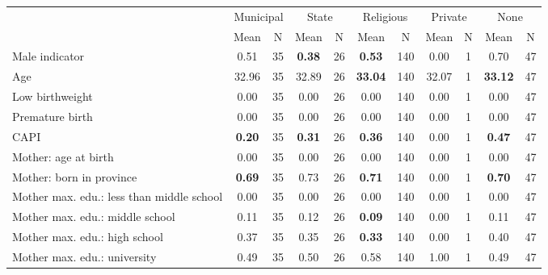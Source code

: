 \begin{tabular}{l c c c c c c c c c c}
\toprule
& \multicolumn{2}{c}{Municipal} & \multicolumn{2}{c}{State} & \multicolumn{2}{c}{Religious} & \multicolumn{2}{c}{Private} & \multicolumn{2}{c}{None} \\
& \scriptsize Mean & \scriptsize N & \scriptsize Mean & \scriptsize N & \scriptsize Mean & \scriptsize N & \scriptsize Mean & \scriptsize N & \scriptsize Mean & \scriptsize N \\
\midrule
Male indicator &      0.51 &        35 & \textbf{     0.38} &        26 & \textbf{     0.53} &       140 &      0.00 &         1 &      0.70 &        47 \\
Age &     32.96 &        35 &     32.89 &        26 & \textbf{    33.04} &       140 &     32.07 &         1 & \textbf{    33.12} &        47 \\
Low birthweight &      0.00 &        35 &      0.00 &        26 &      0.00 &       140 &      0.00 &         1 &      0.00 &        47 \\
Premature birth &      0.00 &        35 &      0.00 &        26 &      0.00 &       140 &      0.00 &         1 &      0.00 &        47 \\
CAPI & \textbf{     0.20} &        35 & \textbf{     0.31} &        26 & \textbf{     0.36} &       140 &      0.00 &         1 & \textbf{     0.47} &        47 \\
Mother: age at birth &      0.00 &        35 &      0.00 &        26 &      0.00 &       140 &      0.00 &         1 &      0.00 &        47 \\
Mother: born in province & \textbf{     0.69} &        35 &      0.73 &        26 & \textbf{     0.71} &       140 &      0.00 &         1 & \textbf{     0.70} &        47 \\
Mother max. edu.: less than middle school &      0.00 &        35 &      0.00 &        26 &      0.00 &       140 &      0.00 &         1 &      0.00 &        47 \\
Mother max. edu.: middle school &      0.11 &        35 &      0.12 &        26 & \textbf{     0.09} &       140 &      0.00 &         1 &      0.11 &        47 \\
Mother max. edu.: high school &      0.37 &        35 &      0.35 &        26 & \textbf{     0.33} &       140 &      0.00 &         1 &      0.40 &        47 \\
Mother max. edu.: university &      0.49 &        35 &      0.50 &        26 &      0.58 &       140 &      1.00 &         1 &      0.49 &        47 \\

\end{tabular}
